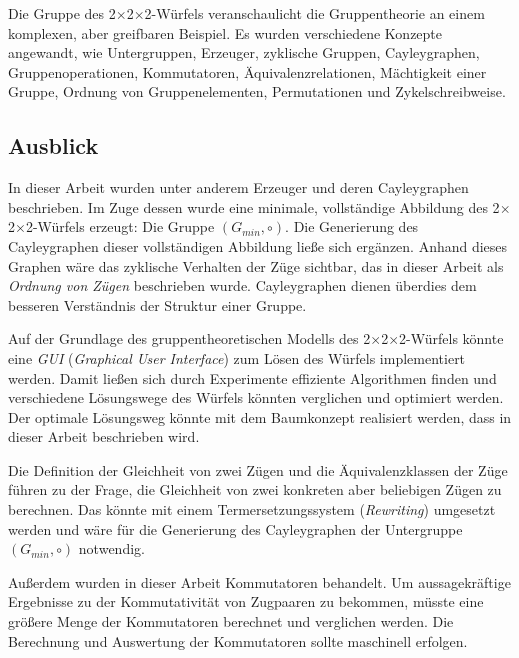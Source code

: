 \documentclass[12pt,a4paper, usenames, dvipsnames]{article}
\theoremstyle{mystyle}
\theoremstyle{definition}
\newcommand{\Ttwo}{2$\times$2$\times$2-}
\begin{document}
Die Gruppe des \Ttwo Würfels veranschaulicht die Gruppentheorie an einem komplexen, aber greifbaren Beispiel. Es wurden verschiedene Konzepte angewandt, wie Untergruppen, Erzeuger, zyklische Gruppen, Cayleygraphen, Gruppenoperationen, Kommutatoren, Äquivalenzrelationen, Mächtigkeit einer Gruppe, Ordnung von Gruppenelementen, Permutationen und Zykelschreibweise. 

%
%
%
%
%
%
%
%
%
%
%
%
%
%
%
%
%
%
%
\subsection{Ausblick}

In dieser Arbeit wurden unter anderem Erzeuger und deren Cayleygraphen beschrieben. Im Zuge dessen wurde eine minimale, vollständige Abbildung des \Ttwo Würfels erzeugt: Die Gruppe $(G_{min}, \circ)$. Die Generierung des Cayleygraphen dieser vollständigen Abbildung ließe sich ergänzen. Anhand dieses Graphen wäre das zyklische Verhalten der Züge sichtbar, das in dieser Arbeit als \textit{Ordnung von Zügen} beschrieben wurde. Cayleygraphen dienen überdies dem besseren Verständnis der Struktur einer Gruppe.
 
Auf der Grundlage des gruppentheoretischen Modells des \Ttwo Würfels könnte eine \textit{GUI} (\textit{Graphical User Interface}) zum Lösen des Würfels implementiert werden. Damit ließen sich durch Experimente effiziente Algorithmen finden und verschiedene Lösungswege des Würfels könnten verglichen und optimiert werden. Der optimale Lösungsweg könnte mit dem Baumkonzept realisiert werden, dass in dieser Arbeit beschrieben wird.

Die Definition der Gleichheit von zwei Zügen und die Äquivalenzklassen der Züge führen zu der Frage, die Gleichheit von zwei konkreten aber beliebigen Zügen zu berechnen.
Das könnte mit einem Termersetzungssystem (\textit{Rewriting}) umgesetzt werden und wäre für die Generierung des Cayleygraphen der Untergruppe $(G_{min}, \circ)$ notwendig.

Außerdem wurden in dieser Arbeit Kommutatoren behandelt. Um aussagekräftige Ergebnisse zu der Kommutativität von Zugpaaren zu bekommen, müsste eine größere Menge der Kommutatoren berechnet und verglichen werden. Die Berechnung und Auswertung der Kommutatoren sollte maschinell erfolgen.



%
%
%
%
%
%
%
%
%
%
%
%
%
%
%
%
%
%
%
\end{document}
